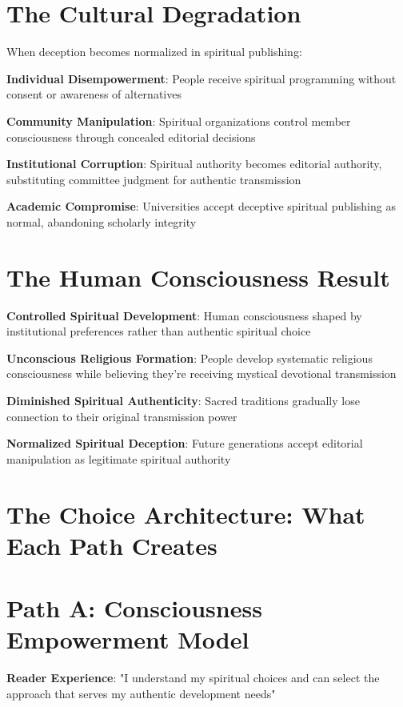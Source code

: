 \documentclass[11pt,twoside]{book}
\begin{document}
\section*{The Cultural Degradation}
\label{sec:orgac18da8}
When deception becomes normalized in spiritual publishing:

\textbf{\textbf{Individual Disempowerment}}: People receive spiritual programming without consent or awareness of alternatives

\textbf{\textbf{Community Manipulation}}: Spiritual organizations control member consciousness through concealed editorial decisions

\textbf{\textbf{Institutional Corruption}}: Spiritual authority becomes editorial authority, substituting committee judgment for authentic transmission

\textbf{\textbf{Academic Compromise}}: Universities accept deceptive spiritual publishing as normal, abandoning scholarly integrity
\section*{The Human Consciousness Result}
\label{sec:org6ca10f3}
\textbf{\textbf{Controlled Spiritual Development}}: Human consciousness shaped by institutional preferences rather than authentic spiritual choice

\textbf{\textbf{Unconscious Religious Formation}}: People develop systematic religious consciousness while believing they're receiving mystical devotional transmission

\textbf{\textbf{Diminished Spiritual Authenticity}}: Sacred traditions gradually lose connection to their original transmission power

\textbf{\textbf{Normalized Spiritual Deception}}: Future generations accept editorial manipulation as legitimate spiritual authority
\section*{The Choice Architecture: What Each Path Creates}
\label{sec:orgc6cfa77}

\section*{Path A: Consciousness Empowerment Model}
\label{sec:orgbbbfd2b}
\textbf{\textbf{Reader Experience}}: "I understand my spiritual choices and can select the approach that serves my authentic development needs"
\end{document}
